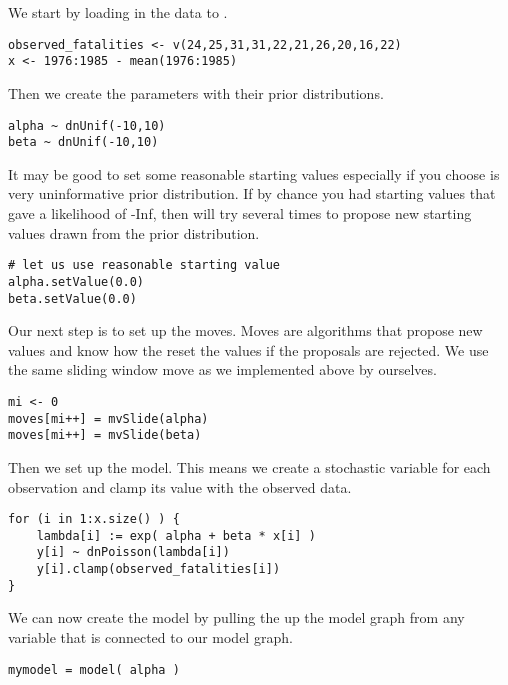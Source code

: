 We start by loading in the data to \RevBayes.
{\tt \begin{snugshade*}
\begin{lstlisting} 
observed_fatalities <- v(24,25,31,31,22,21,26,20,16,22)
x <- 1976:1985 - mean(1976:1985)
\end{lstlisting}
\end{snugshade*}}
Then we create the parameters with their prior distributions.
{\tt \begin{snugshade*}
\begin{lstlisting} 
alpha ~ dnUnif(-10,10) 
beta ~ dnUnif(-10,10)
\end{lstlisting}
\end{snugshade*}}
It may be good to set some reasonable starting values especially if you choose is very uninformative prior distribution.
If by chance you had starting values that gave a likelihood of -Inf, then \RevBayes will try several times to propose new starting values drawn from the prior distribution.
{\tt \begin{snugshade*}
\begin{lstlisting} 
# let us use reasonable starting value
alpha.setValue(0.0)
beta.setValue(0.0)
\end{lstlisting}
\end{snugshade*}}
Our next step is to set up the moves.
Moves are algorithms that propose new values and know how the reset the values if the proposals are rejected.
We use the same sliding window move as we implemented above by ourselves.
{\tt \begin{snugshade*}
\begin{lstlisting} 
mi <- 0
moves[mi++] = mvSlide(alpha)
moves[mi++] = mvSlide(beta)
\end{lstlisting}
\end{snugshade*}}
Then we set up the model.
This means we create a stochastic variable for each observation and clamp its value with the observed data.
{\tt \begin{snugshade*}
\begin{lstlisting} 
for (i in 1:x.size() ) {
    lambda[i] := exp( alpha + beta * x[i] )
    y[i] ~ dnPoisson(lambda[i])
    y[i].clamp(observed_fatalities[i])
}
\end{lstlisting}
\end{snugshade*}}
We can now create the model by pulling the up the model graph from any variable that is connected to our model graph.
{\tt \begin{snugshade*}
\begin{lstlisting} 
mymodel = model( alpha )
\end{lstlisting}
\end{snugshade*}}
